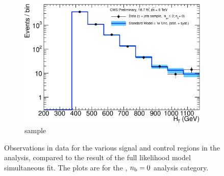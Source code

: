 \begin{figure}[h!]
\begin{subfigure}[b]{0.48\textwidth}
    \includegraphics[width=\textwidth]
    {Figs/results/v0/blueBand/single_plots/photon_0b_le3j_logy.pdf}
    \caption{\gj sample}
  \end{subfigure}
  \caption{Observations in data for the various signal and control
  regions in the analysis, compared to the result of the full likelihood model
  simultaneous fit. The plots are for the \njlow, $n_{\text{b}} = 0$ analysis category.}
  \label{fig:blue_fits_0b_le3j}
\end{figure}

